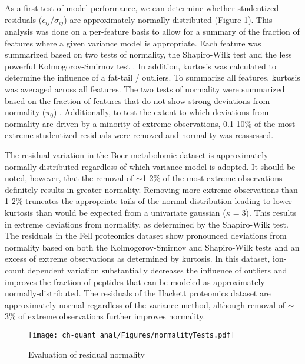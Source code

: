 As a first test of model performance, we can determine whether studentized residuals ($\epsilon_{ij} / \sigma_{ij}$) are approximately normally distributed (\hyperref[ch-quant_anal:normalityTests]{Figure \ref{ch-quant_anal:normalityTests}}). This analysis was done on a per-feature basis to allow for a summary of the fraction of features where a given variance model is appropriate. Each feature was summarized based on two tests of normality, the Shapiro-Wilk test \cite{Shapiro:1965gf} and the less powerful Kolmogorov-Smirnov test \cite{Lilliefors:1967bh}. In addition, kurtosis was calculated to determine the influence of a fat-tail / outliers. To summarize all features, kurtosis was averaged across all features. The two tests of normality were summarized based on the fraction of features that do not show strong deviations from normality ($\pi_{0}$) \cite{Storey:2003cj}. Additionally, to test the extent to which deviations from normality are driven by a minority of extreme observations, 0.1-10\% of the most extreme studentized residuals were removed and normality was reassessed.

The residual variation in the Boer metabolomic dataset is approximately normally distributed regardless of which variance model is adopted. It should be noted, however, that the removal of $\sim$1-2\% of the most extreme observations definitely results in greater normality.  Removing more extreme observations than 1-2\% truncates the appropriate tails of the normal distribution leading to lower kurtosis than would be expected from a univariate gaussian ($\kappa = 3$). This results in extreme deviations from normality, as determined by the Shapiro-Wilk test. The residuals in the Fell proteomics dataset show pronounced deviations from normality based on both the Kolmogorov-Smirnov and Shapiro-Wilk tests and an excess of extreme observations as determined by kurtosis. In this dataset, ion-count dependent variation substantially decreases the influence of outliers and improves the fraction of peptides that can be modeled as approximately normally-distributed. The residuals of the Hackett proteomics dataset are approximately normal regardless of the variance method, although removal of $\sim$3\% of extreme observations further improves normality.

\begin{figure}[h!]
\begin{center}
\texttt{[image: ch-quant\_anal/Figures/normalityTests.pdf]}
\caption[Evaluation of residual normality]{Evaluation of residual normality}
\label{ch-quant_anal:normalityTests}
\end{center}
\end{figure}

